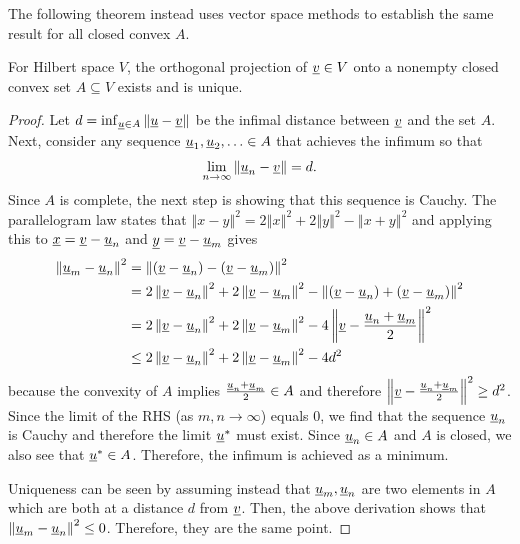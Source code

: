 The following theorem instead uses vector space methods to establish the same result for all closed convex $A$.

\begin{theorem}
\label{theorem:HilbertProjectionTheorem} For Hilbert space $V$, the orthogonal projection of $\underline v \in V$ onto a nonempty closed convex set $A\subseteq V$ exists and is unique.
\end{theorem}
\begin{proof}

Let $d=\inf_{\underline u\in A}\left\Vert \underline u-\underline v\right\Vert$ be the infimal distance between $\underline v$ and the set $A$.
Next, consider any sequence $\underline u_{1},\underline u_{2},\ldots\in A$ that achieves the infimum so that
\[
\lim_{n\rightarrow\infty}\left\Vert \underline u_{n}-\underline v\right\Vert =d.
\]
Since $A$ is complete, the next step is showing that this sequence is Cauchy. The parallelogram law states that $\left\Vert x-y\right\Vert ^{2}=2\left\Vert x\right\Vert ^{2}+2\left\Vert y\right\Vert ^{2}-\left\Vert x+y\right\Vert ^{2}$ and applying this to $\underline{x}=\underline{v}-\underline u_{n}$ and $\underline{y}=\underline{v}-\underline u_{m}$ gives
\begin{align*}
\left\Vert \underline u_{m}-\underline u_{n}\right\Vert ^{2} & =\left\Vert \left(\underline v-\underline u_{n}\right)-\left(\underline v-\underline u_{m}\right)\right\Vert ^{2}\\
 & =2\left\Vert \underline v-\underline u_{n}\right\Vert ^{2}+2\left\Vert \underline v-\underline u_{m}\right\Vert ^{2}-\left\Vert \left(\underline v-\underline u_{n}\right)+\left(\underline v-\underline u_{m}\right)\right\Vert ^{2}\\
 & =2\left\Vert \underline v-\underline u_{n}\right\Vert ^{2}+2\left\Vert \underline v-\underline u_{m}\right\Vert ^{2}-4\left\Vert \underline v-\frac{\underline u_{n}+\underline u_{m}}{2}\right\Vert ^{2}\\
 & \leq2\left\Vert \underline v-\underline u_{n}\right\Vert ^{2}+2\left\Vert \underline v-\underline u_{m}\right\Vert ^{2}-4d^{2}
\end{align*}
because the convexity of $A$ implies $\frac{\underline u_{n}+\underline u_{m}}{2}\in A$ and therefore $\left\Vert \underline v-\frac{\underline u_{n}+\underline u_{m}}{2}\right\Vert ^{2}\geq d^{2}$. Since the limit of the RHS (as $m,n\rightarrow\infty$) equals $0$, we find that the sequence $\underline u_{n}$ is Cauchy and therefore the limit $\underline u^{*}$ must exist. Since $\underline u_{n}\in A$ and $A$ is closed, we also see that $\underline u^{*}\in A$. Therefore, the infimum is achieved as a minimum.

Uniqueness can be seen by assuming instead that $\underline u_{m},\underline u_{n}$ are two elements in $A$ which are both at a distance $d$ from $\underline v$. Then, the above derivation shows that $\left\Vert \underline u_{m}-\underline u_{n}\right\Vert ^{2}\leq0$. Therefore, they are the same point.
\end{proof}

